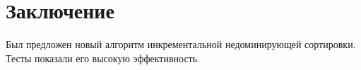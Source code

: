 \chapter{Заключение}
\label{outro}

Был предложен новый алгоритм инкрементальной недоминирующей сортировки.
Тесты показали его высокую эффективность.

